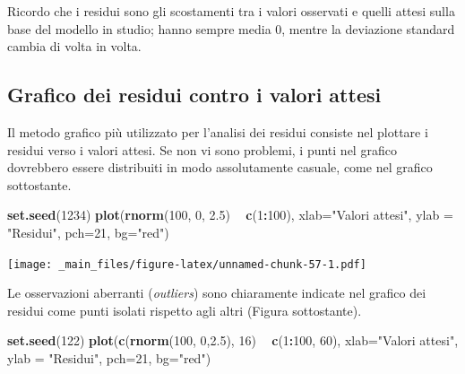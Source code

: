 \documentclass[a4paper,12pt,oneside]{book}
\newenvironment{Shaded}{\begin{snugshade}}{\end{snugshade}}
\newcommand{\KeywordTok}[1]{\textcolor[rgb]{0.13,0.29,0.53}{\textbf{#1}}}
\newcommand{\DataTypeTok}[1]{\textcolor[rgb]{0.13,0.29,0.53}{#1}}
\newcommand{\DecValTok}[1]{\textcolor[rgb]{0.00,0.00,0.81}{#1}}
\newcommand{\FloatTok}[1]{\textcolor[rgb]{0.00,0.00,0.81}{#1}}
\newcommand{\StringTok}[1]{\textcolor[rgb]{0.31,0.60,0.02}{#1}}
\newcommand{\OperatorTok}[1]{\textcolor[rgb]{0.81,0.36,0.00}{\textbf{#1}}}
\newcommand{\NormalTok}[1]{#1}
\theoremstyle{definition}
\theoremstyle{definition}
\theoremstyle{definition}
\theoremstyle{remark}
\begin{document}
Ricordo che i residui sono gli scostamenti tra i valori osservati e
quelli attesi sulla base del modello in studio; hanno sempre media 0,
mentre la deviazione standard cambia di volta in volta.

\subsection{Grafico dei residui contro i valori
attesi}\label{grafico-dei-residui-contro-i-valori-attesi}

Il metodo grafico più utilizzato per l'analisi dei residui consiste nel
plottare i residui verso i valori attesi. Se non vi sono problemi, i
punti nel grafico dovrebbero essere distribuiti in modo assolutamente
casuale, come nel grafico sottostante.

\begin{Shaded}
\begin{Highlighting}[]
\KeywordTok{set.seed}\NormalTok{(}\DecValTok{1234}\NormalTok{)}
\KeywordTok{plot}\NormalTok{(}\KeywordTok{rnorm}\NormalTok{(}\DecValTok{100}\NormalTok{, }\DecValTok{0}\NormalTok{, }\FloatTok{2.5}\NormalTok{) }\OperatorTok{~}\StringTok{ }\KeywordTok{c}\NormalTok{(}\DecValTok{1}\OperatorTok{:}\DecValTok{100}\NormalTok{), }\DataTypeTok{xlab=}\StringTok{"Valori attesi"}\NormalTok{, }
     \DataTypeTok{ylab =} \StringTok{"Residui"}\NormalTok{, }\DataTypeTok{pch=}\DecValTok{21}\NormalTok{, }\DataTypeTok{bg=}\StringTok{"red"}\NormalTok{)}
\end{Highlighting}
\end{Shaded}

\texttt{[image: \_main\_files/figure-latex/unnamed-chunk-57-1.pdf]}

Le osservazioni aberranti (\emph{outliers}) sono chiaramente indicate
nel grafico dei residui come punti isolati rispetto agli altri (Figura
sottostante).

\begin{Shaded}
\begin{Highlighting}[]
\KeywordTok{set.seed}\NormalTok{(}\DecValTok{122}\NormalTok{)}
\KeywordTok{plot}\NormalTok{(}\KeywordTok{c}\NormalTok{(}\KeywordTok{rnorm}\NormalTok{(}\DecValTok{100}\NormalTok{, }\DecValTok{0}\NormalTok{,}\FloatTok{2.5}\NormalTok{), }\DecValTok{16}\NormalTok{) }\OperatorTok{~}\StringTok{ }\KeywordTok{c}\NormalTok{(}\DecValTok{1}\OperatorTok{:}\DecValTok{100}\NormalTok{, }\DecValTok{60}\NormalTok{), }\DataTypeTok{xlab=}\StringTok{"Valori attesi"}\NormalTok{, }
     \DataTypeTok{ylab =} \StringTok{"Residui"}\NormalTok{, }\DataTypeTok{pch=}\DecValTok{21}\NormalTok{, }\DataTypeTok{bg=}\StringTok{"red"}\NormalTok{)}
\end{Highlighting}
\end{Shaded}
\end{document}
